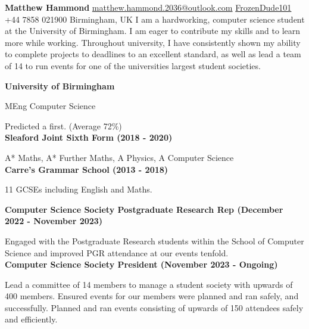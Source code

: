 \documentclass[twoside,a4paper,12pt]{report}
\begin{document}
\textbf{\huge Matthew Hammond}
\hr
\noindent\href{mailto:matthew.hammond.2036@outlook.com}
{\faEnvelope\hspace{5pt}matthew.hammond.2036@outlook.com}
\hfill
\href{https://github.com/FrozenDude101/}
{FrozenDude101\hspace{5pt}\faGithub}\\
\faPhone\hspace{5pt}+44 7858 021900
\hfill
Birmingham, UK\hspace{5pt}\faGlobe
\hr
I am a hardworking, computer science student at the University of Birmingham. I am eager to contribute my skills and to learn more while working. Throughout university, I have consistently shown my ability to complete projects to deadlines to an excellent standard, as well as lead a team of 14 to run events for one of the universities largest student societies.

\noindent\textbf{University of Birmingham}

MEng Computer Science

Predicted a first. (Average 72\%)\\
\noindent\textbf{Sleaford Joint Sixth Form (2018 - 2020)}

A* Maths, A* Further Maths, A Physics, A Computer Science\\
\noindent\textbf{Carre’s Grammar School (2013 - 2018)}

11 GCSEs including English and Maths.

\textbf{Computer Science Society Postgraduate Research Rep (December 2022 - November 2023)}

Engaged with the Postgraduate Research students within the School of Computer Science and improved PGR attendance at our events tenfold.\\
\textbf{Computer Science Society President (November 2023 - Ongoing)}

Lead a committee of 14 members to manage a student society with upwards of 400 members. Ensured events for our members were planned and ran safely, and successfully. Planned and ran events consisting of upwards of 150 attendees safely and efficiently.
\end{document}
